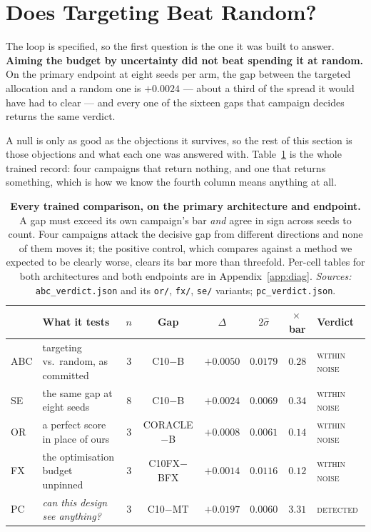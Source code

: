 \documentclass{article} %
\begin{document}
\section{Does Targeting Beat Random?}
\label{sec:null}
The loop is specified, so the first question is the one it was built to answer. \textbf{Aiming the
budget by uncertainty did not beat spending it at random.} On the primary endpoint at eight seeds
per arm, the gap between the targeted allocation and a random one is $+0.0024$ --- about a third of
the spread it would have had to clear --- and every one of the sixteen gaps that campaign decides
returns the same verdict.

A null is only as good as the objections it survives, so the rest of this section is those
objections and what each one was answered with. Table~\ref{tab:trained} is the whole trained record:
four campaigns that return nothing, and one that returns something, which is how we know the fourth
column means anything at all.

\begin{table}[t]
\caption{\textbf{Every trained comparison, on the primary architecture and endpoint.} A gap must
exceed its own campaign's bar \emph{and} agree in sign across seeds to count. Four campaigns attack
the decisive gap from different directions and none of them moves it; the positive control, which
compares against a method we expected to be clearly worse, clears its bar more than threefold.
Per-cell tables for both architectures and both endpoints are in Appendix~\ref{app:diag}.
\emph{Sources:} \texttt{abc\_verdict.json} and its \texttt{or/}, \texttt{fx/}, \texttt{se/}
variants; \texttt{pc\_verdict.json}.}
\label{tab:trained}
\begin{center}
\small
\setlength{\tabcolsep}{4.5pt}
\begin{tabular}{@{}llcccccl@{}}
\toprule
& What it tests & $n$ & Gap & $\Delta$ & $2\hat{\sigma}$ & $\times$\,bar & Verdict \\
\midrule
ABC & targeting vs.\ random, as committed & $3$ & C10$-$B & $+0.0050$ & $0.0179$ & $0.28$ & \textsc{within noise} \\
SE & the same gap at eight seeds & $8$ & C10$-$B & $+0.0024$ & $0.0069$ & $0.34$ & \textsc{within noise} \\
OR & a perfect score in place of ours & $3$ & CORACLE$-$B & $+0.0008$ & $0.0061$ & $0.14$ & \textsc{within noise} \\
FX & the optimisation budget unpinned & $3$ & C10FX$-$BFX & $+0.0014$ & $0.0116$ & $0.12$ & \textsc{within noise} \\
\midrule
PC & \emph{can this design see anything?} & $3$ & C10$-$MT & $+0.0197$ & $0.0060$ & $\mathbf{3.31}$ & \textsc{detected} \\
\bottomrule
\end{tabular}
\end{center}
\end{table}
\end{document}

